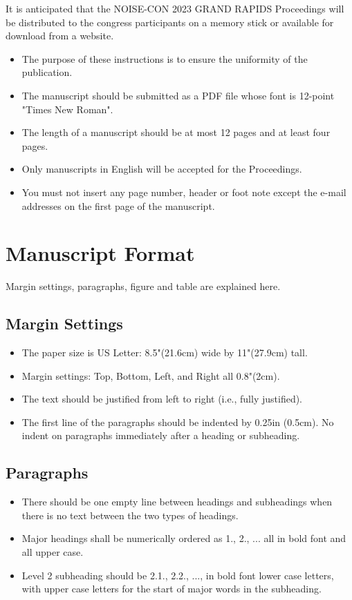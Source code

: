 \documentclass[letterpaper,12pt]{article}
\begin{document}
It is anticipated that the NOISE-CON 2023 GRAND RAPIDS Proceedings will be distributed to the congress participants on a memory stick or available for download from a website. 

\begin{itemize}[noitemsep]
\item 
The purpose of these instructions is to ensure the uniformity of the publication. 
\item
The manuscript should be submitted as a PDF file whose font is 12-point "Times New Roman".
\item
The length of a manuscript should be at most 12 pages and at least four pages. 
\item
Only manuscripts in English will be accepted for the Proceedings. 
\item
You must not insert any page number, header or foot note except the e-mail addresses on the first page of the manuscript.
\end{itemize}
 
 
\section{Manuscript Format}
\noindent
Margin settings, paragraphs, figure and table are explained here. 

\subsection{Margin Settings}
\begin{itemize}[noitemsep]
\item
The paper size is US Letter: 8.5"(21.6cm) wide by 11"(27.9cm) tall.
\item
Margin settings: Top, Bottom, Left, and Right all 0.8"(2cm).
\item
The text should be justified from left to right (i.e., fully justified).
\item
The first line of the paragraphs should be indented by 0.25in (0.5cm).  No indent on paragraphs immediately after a heading or subheading.
\end{itemize}

\subsection{Paragraphs}

\begin{itemize}[noitemsep]
\item
There should be one empty line between headings and subheadings when there is no text between the two types of headings. 
\item
Major headings shall be numerically ordered as 1., 2., ... all in bold font and all upper case.
\item
Level 2 subheading should be 2.1., 2.2., ..., in bold font lower case letters, with upper case letters for the start of major words in the subheading. 
\end{itemize}
\end{document}
